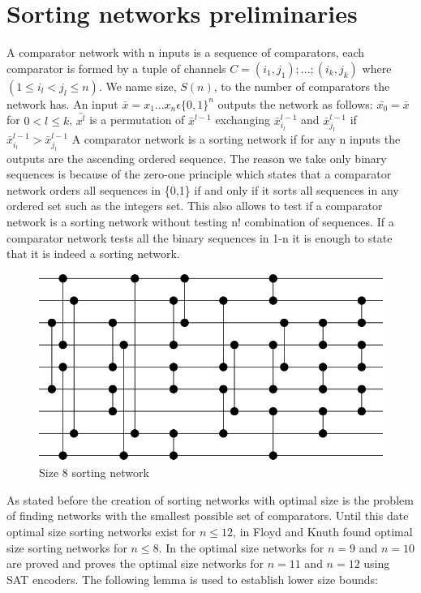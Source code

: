 \documentclass[../main.tex]{subfiles}
\begin{document}
	\section{Sorting networks preliminaries}
	A comparator network with n inputs is a sequence of comparators, each comparator is formed by a tuple of channels $C=(i_1,j_1);...;(i_k,j_k)$ where $(1 \leq i_l < j_l \leq n)$. We name size, $S(n)$, to the number of comparators the network has. An input $\bar{x}=x_1...x_n \epsilon \{0, 1\}^n$ outputs the network as follows: $\bar{x_0}=\bar{x}$ for $0<l\leq k$, $\bar{x^l}$ is a permutation of $\bar x^{l-1}$ exchanging $\bar x^{l-1}_{i_l}$ and $\bar x^{l-1}_{j_l}$ if $\bar x^{l-1}_{i_l} > \bar x^{l-1}_{j_l}$
	A comparator network is a sorting network if for any n inputs the outputs are the ascending ordered sequence. The reason we take only binary sequences is because of the zero-one principle\cite{knuth1997art} which states that a comparator network orders all sequences in \{0,1\} if and only if it sorts all sequences in any ordered set such as the integers set. This also allows to test if a comparator network is a sorting network without testing n! combination of sequences. If a comparator network tests all the binary sequences in 1-n it is enough to state that it is indeed a sorting network.
	
	\begin{figure}[H]
		\centering
		\includegraphics[scale=0.8]{images/Size8SortingNetwork}
		\caption{Size 8 sorting network}
		\label{fig:images/Size8SortingNetwork}
	\end{figure}

	As stated before the creation of sorting networks with optimal size is the problem of finding networks with the smallest possible set of comparators. Until this date optimal size sorting networks exist for $n \leq 12$, in \cite{FLOYD1973163} Floyd and Knuth found optimal size sorting networks for $n \leq 8$. In \cite{sortingnineinputs} the optimal size networks for $n = 9$ and $n = 10$ are proved and \cite{harder2021answer} proves the optimal size networks for $n = 11$ and $n = 12$ using SAT encoders. The following lemma \cite{VanVoorhis1972} is used to establish lower size bounds:
	
\end{document}
